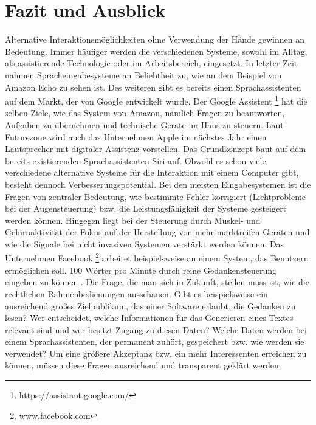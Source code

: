 \chapter{Fazit und Ausblick}

Alternative Interaktionsmöglichkeiten ohne Verwendung der Hände gewinnen an Bedeutung. Immer häufiger werden die verschiedenen Systeme, sowohl im Alltag, als assistierende Technologie oder im Arbeitsbereich, eingesetzt.
\newline \newline
In letzter Zeit nahmen Spracheingabesysteme an Beliebtheit zu, wie an dem Beispiel von Amazon Echo zu sehen ist. Des weiteren gibt es bereits einen Sprachassistenten auf dem Markt, der von Google entwickelt wurde. Der Google Assistent%
\footnote{https://assistant.google.com/}
%
hat die selben Ziele, wie das System von Amazon, nämlich Fragen zu beantworten, Aufgaben zu übernehmen und technische Geräte im Haus zu steuern. Laut Futurezone \cite{Futurezone} wird auch das Unternehmen Apple im nächstes Jahr einen Lautsprecher mit digitaler Assistenz vorstellen. Das Grundkonzept baut auf dem bereits existierenden Sprachassistenten Siri auf.
\newline \newline
Obwohl es schon viele verschiedene alternative Systeme für die Interaktion mit einem Computer gibt, besteht dennoch Verbesserungspotential. Bei den meisten Eingabesystemen ist die Fragen von zentraler Bedeutung, wie bestimmte Fehler korrigiert (\zB Lichtprobleme bei der Augensteuerung) bzw. die Leistungsfähigkeit der Systeme gesteigert werden können. Hingegen liegt bei der Steuerung durch Muskel- und Gehirnaktivität der Fokus auf der Herstellung von mehr marktreifen Geräten und wie die Signale bei nicht invasiven Systemen verstärkt werden können. Das Unternehmen Facebook%
\footnote{www.facebook.com}
%
arbeitet beispielsweise an einem System, das Benutzern ermöglichen soll, 100 Wörter pro Minute durch reine Gedankensteuerung eingeben zu können \cite{Facebook}.
\newline \newline
Die Frage, die man sich in Zukunft, stellen muss ist, wie die rechtlichen Rahmenbedienungen ausschauen. Gibt es beispielsweise ein ausreichend großes Zielpublikum, das einer Software erlaubt, die Gedanken zu lesen? Wer entscheidet, welche Informationen für das Generieren eines Textes relevant sind und wer besitzt Zugang zu diesen Daten? Welche Daten werden bei einem Sprachassistenten, der permanent zuhört, gespeichert bzw. wie werden sie verwendet? Um eine größere Akzeptanz bzw. ein mehr Interessenten erreichen zu können, müssen diese Fragen ausreichend und transparent geklärt werden.
